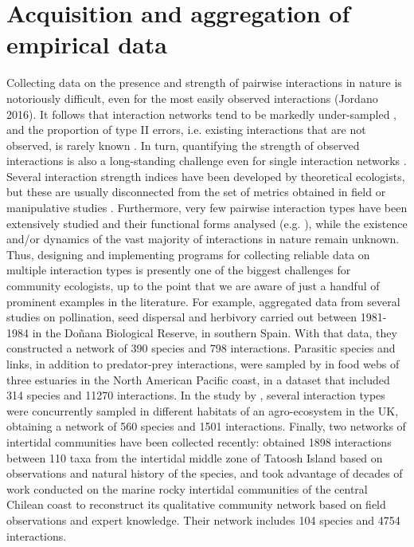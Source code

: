 \section*{Acquisition and aggregation of empirical data}

Collecting data on the presence and strength of pairwise interactions in nature is notoriously difficult, even for the most easily observed interactions (Jordano 2016). It follows that interaction networks tend to be markedly under{}-sampled \citep{Chacoff2012}, and the proportion of type II errors, i.e. existing interactions that are not observed, is rarely known \citep{Olesen2011a, Morales-Castilla2015, Gravel2016}. In turn, quantifying the strength of observed interactions is also a long-standing challenge even for single interaction networks \citep{Berlow2004}. Several interaction strength indices have been developed by theoretical ecologists, but these are usually disconnected from the set of metrics obtained in field or manipulative studies \citep{Wootton2005}. Furthermore, very few pairwise interaction types have been extensively studied and their functional forms analysed (e.g. \citealt{Holland2002, Novak2008}), while the existence and/or dynamics of the vast majority of interactions in nature remain unknown. Thus, designing and implementing programs for collecting reliable data on multiple interaction types is presently one of the biggest challenges for community ecologists, up to the point that we are aware of just a handful of prominent examples in the literature. For example, \cite{Melian2009} aggregated data from several studies on pollination, seed dispersal and herbivory carried out between 1981-1984 in the Do\~nana Biological Reserve, in southern Spain. With that data, they constructed a network of 390 species and 798 interactions. Parasitic species and links, in addition to predator-prey interactions, were sampled by \cite{Hechinger2011} in food webs of three estuaries in the North American Pacific coast, in a dataset that included 314 species and 11270 interactions. In the study by \cite{Pocock2012}, several interaction types were concurrently sampled in different habitats of an agro{}-ecosystem in the UK, obtaining a network of 560 species and 1501 interactions. Finally, two networks of intertidal communities have been collected recently: \cite{Sander2015} obtained 1898 interactions between 110 taxa from the intertidal middle zone of Tatoosh Island based on observations and natural history of the species, and \cite{Kefi2015} took advantage of decades of work conducted on the marine rocky intertidal communities of the central Chilean coast to reconstruct its qualitative community network based on field observations and expert knowledge. Their network includes 104 species and 4754 interactions.

